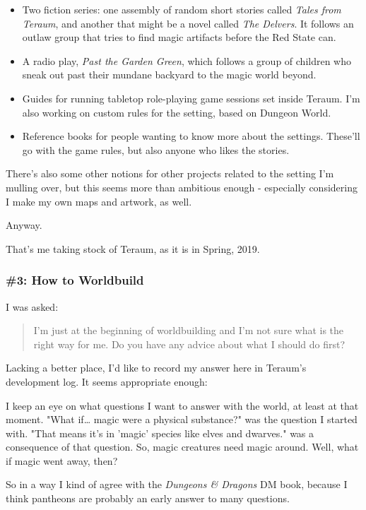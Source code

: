 \documentclass[11pt]{article}
\begin{document}
\begin{itemize}
\item Two fiction series: one assembly of random short stories called
\emph{Tales from Teraum}, and another that might be a novel called \emph{The
Delvers}. It follows an outlaw group that tries to find magic
artifacts before the Red State can.
\item A radio play, \emph{Past the Garden Green}, which follows a group of
children who sneak out past their mundane backyard to the magic
world beyond.
\item Guides for running tabletop role-playing game sessions set inside
Teraum. I'm also working on custom rules for the setting, based on
Dungeon World.
\item Reference books for people wanting to know more about the settings.
These'll go with the game rules, but also anyone who likes the
stories.
\end{itemize}

There's also some other notions for other projects related to the
setting I'm mulling over, but this seems more than ambitious enough -
especially considering I make my own maps and artwork, as well.

Anyway.

That's me taking stock of Teraum, as it is in Spring, 2019.
\subsubsection*{\#3: How to Worldbuild}
\label{sec:org9f57cd8}
I was asked:

\begin{quote}
I'm just at the beginning of worldbuilding and I'm not
sure what is the right way for me. Do you have any advice about what I
should do first?
\end{quote}

Lacking a better place, I'd like to record my answer here in Teraum's
development log. It seems appropriate enough:

I keep an eye on what questions I want to answer with the world, at
least at that moment. "What if\ldots{} magic were a physical substance?"
was the question I started with. "That means it's in 'magic' species
like elves and dwarves." was a consequence of that question. So, magic
creatures need magic around. Well, what if magic went away, then?

So in a way I kind of agree with the \emph{Dungeons \& Dragons} DM book,
because I think pantheons are probably an early answer to many
questions.
\end{document}
